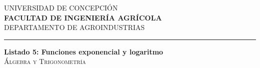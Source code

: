 \documentclass[11pt]{article}
\begin{document}
UNIVERSIDAD DE CONCEPCI\'ON
\\
\textbf{\small FACULTAD DE INGENIER\'IA AGR\'ICOLA}
\\
DEPARTAMENTO DE AGROINDUSTRIAS\\
\rule{16cm}{.5pt}
% 

\vspace{0.5cm}

\begin{center}
  \textbf{Listado 5: Funciones exponencial y logaritmo}
  \\
  \textsc{\'Algebra y Trigonometr\'ia}
\end{center}
\end{document}
